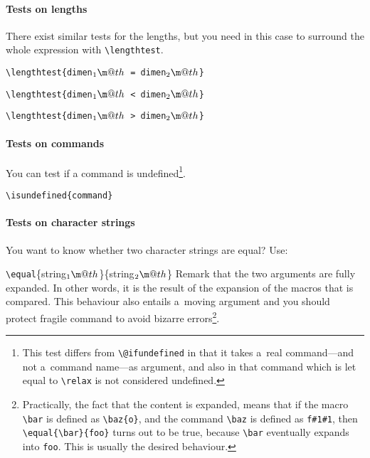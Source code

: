 \documentclass{article}
\makeatletter
\newcommand*{\cmd}[1]{\tex{\textbackslash #1}}
\newcommand*{\tex}{\texttt}
\newenvironment*{texcode}{\list{}{}\item\ttfamily}{\endlist}
\newcommand*{\marg}[1]{\{\meta{#1}\}}
\newcommand*{\meta}[1]{\textnormal{\textlangle#1\textrangle}}
\newcommand*{\1}{$_1\m@th$}
\newcommand*{\2}{$_2\m@th$}
\makeatother
\begin{document}
\paragraph{Tests on lengths}

There exist similar tests for the lengths, but you need in this case
to surround the whole expression with \cmd{lengthtest}.
%
\begin{list}{}{}
\item \tex{\cmd{lengthtest}\{\meta{dimen\1} = \meta{dimen\2}\}}
\item \tex{\cmd{lengthtest}\{\meta{dimen\1} < \meta{dimen\2}\}}
\item \tex{\cmd{lengthtest}\{\meta{dimen\1} > \meta{dimen\2}\}}
\end{list}

\paragraph{Tests on commands}
 
You can test if a command is undefined\footnote{This test differs from
  \cmd{@ifundefined} in that it takes a~real command---and not
  a~command name---as argument, and also in that command which is let
  equal to \cmd{relax} is not considered undefined.}.
%
\begin{list}{}{}
\item \tex{\cmd{isundefined}\marg{command}}
\end{list}

\paragraph{Tests on character strings}

You want to know whether two character strings are equal?  Use:
%
\begin{texcode}
\cmd{equal}\marg{string\1}\marg{string\2}
\end{texcode}
%
Remark that the two arguments are fully expanded.  In other words, it
is the result of the expansion of the macros that is compared.  This
behaviour also entails a~moving argument and you should protect
fragile command to avoid bizarre errors\footnote{Practically, the
  fact that the content is expanded, means that if the macro \cmd{bar}
  is defined as \tex{\cmd{baz}\{o\}}, and the command \cmd{baz} is defined
  as \tex{f\#1\#1}, then \tex{\cmd{equal}\{\cmd{bar}\}\{foo\}} turns out to
  be true, because \cmd{bar} eventually expands into \tex{foo}.  This is
  usually the desired behaviour.}.
\end{document}
